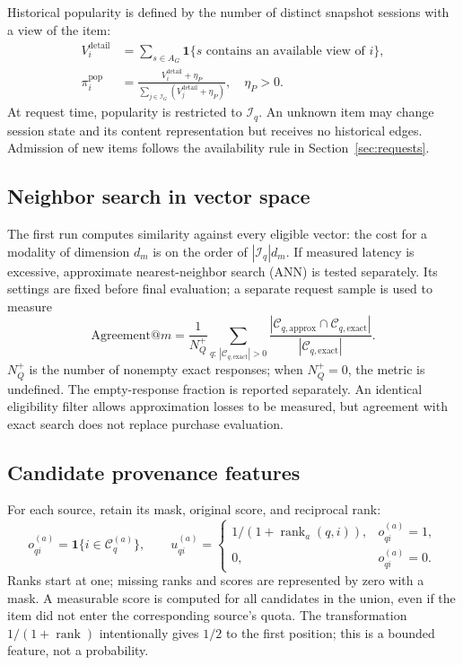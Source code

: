 \documentclass[12pt,a4paper]{article}
\newcommand{\ind}{\mathbf 1}
\theoremstyle{plainru}
\begin{document}
Historical popularity is defined by the number of distinct
snapshot sessions with a view of the item:
\begin{align}\label{eq:model-popularity}
V_i^{\mathrm{detail}}&=\sum_{s\in A_G}
\ind\{s\text{ contains an available view of }i\},\\
\pi_i^{\mathrm{pop}}&=\frac{V_i^{\mathrm{detail}}+\eta_P}
 {\sum_{j\in\mathcal I_G}(V_j^{\mathrm{detail}}+\eta_P)},
\quad\eta_P>0.
\nonumber\end{align}
At request time, popularity is restricted to $\mathcal I_q$.
An unknown item may change session state and its content
representation but receives no historical edges. Admission of new
items follows the availability rule in Section~\ref{sec:requests}.

\subsection{Neighbor search in vector space}

The first run computes similarity against every eligible vector:
the cost for a modality of dimension $d_m$ is on the order of $|\mathcal I_q|d_m$.
If measured latency is excessive, approximate
nearest-neighbor search (ANN) is tested separately.
Its settings are fixed before final evaluation; a separate request
sample is used to measure
\begin{equation}\label{eq:model-ann-agreement}
\mathrm{Agreement@}m=
\frac1{N_Q^+}\sum_{q:\,|\mathcal C_{q,\mathrm{exact}}|>0}
\frac{|\mathcal C_{q,\mathrm{approx}}\cap
\mathcal C_{q,\mathrm{exact}}|}
 {|\mathcal C_{q,\mathrm{exact}}|}.
\end{equation}
$N_Q^+$ is the number of nonempty exact responses; when $N_Q^+=0$, the metric
is undefined. The empty-response fraction is reported separately.
An identical eligibility filter allows approximation losses to be measured,
but agreement with exact search does not replace purchase evaluation.

\subsection{Candidate provenance features}

For each source, retain its mask, original score,
and reciprocal rank:
\begin{equation}\label{eq:model-source-rank}
o_{qi}^{(a)}=\ind\{i\in\mathcal C_q^{(a)}\},\qquad
u_{qi}^{(a)}=
\begin{cases}
1/(1+\operatorname{rank}_a(q,i)),&o_{qi}^{(a)}=1,\\
0,&o_{qi}^{(a)}=0.
\end{cases}
\end{equation}
Ranks start at one; missing ranks and scores are represented by zero
with a mask. A measurable score is computed for all candidates in the union,
even if the item did not enter the corresponding source's quota.
The transformation $1/(1+\operatorname{rank})$ intentionally gives $1/2$
to the first position; this is a bounded feature, not a probability.
\end{document}
